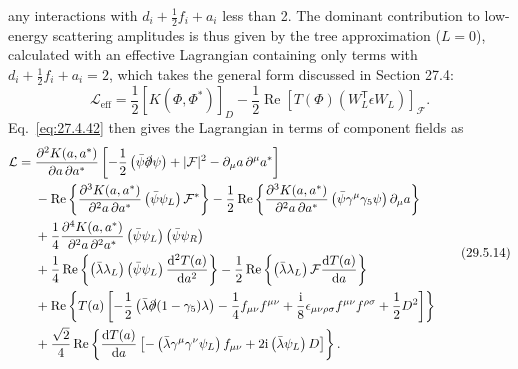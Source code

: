 any interactions with \(d_i+\tfrac12f_i+a_i\) less than 2. The dominant
contribution to low-energy scattering amplitudes is thus given by the tree
approximation (\(L=0\)), calculated with an effective Lagrangian containing
only terms with \(d_i+\tfrac12f_i+a_i=2\), which takes the general form
discussed in Section 27.4:
\begin{equation}
  \mathcal{L}_{\mathrm{eff}}
  =\frac12\left[K(\Phi,\Phi^*)\right]_D
  -\frac12\operatorname{Re}
    \left[T(\Phi)\left(W_L^{\mathsf T}\epsilon W_L\right)\right]_{\mathcal F}.
  \tag{29.5.13}\label{eq:29.5.13}
\end{equation}
Eq.~\eqref{eq:27.4.42} then gives the Lagrangian in terms of component
fields as
\begin{equation}
  \begin{aligned}
  \mathcal{L}
  ={}&
  \frac{\partial^2K(a,a^*)}{\partial a\,\partial a^*}
  \left[
    -\frac12\left(\bar\psi\slashed{\partial}\psi\right)
    +\lvert\mathcal{F}\rvert^2
    -\partial_\mu a\,\partial^\mu a^*
  \right]
  \\
  &-\operatorname{Re}\left\{
    \frac{\partial^3K(a,a^*)}{\partial^2a\,\partial a^*}
    \left(\bar\psi\psi_L\right)\mathcal{F}^*
  \right\}
  -\frac12\operatorname{Re}\left\{
    \frac{\partial^3K(a,a^*)}{\partial^2a\,\partial a^*}
    \left(\bar\psi\gamma^\mu\gamma_5\psi\right)\partial_\mu a
  \right\}
  \\
  &+\frac14
    \frac{\partial^4K(a,a^*)}{\partial^2a\,\partial^2a^*}
    \left(\bar\psi\psi_L\right)\left(\bar\psi\psi_R\right)
  \\
  &+\frac14\operatorname{Re}\left\{
    \left(\bar\lambda\lambda_L\right)
    \left(\bar\psi\psi_L\right)\frac{\mathop{}\!\mathrm{d}^2T(a)}{\mathop{}\!\mathrm{d} a^2}
  \right\}
  -\frac12\operatorname{Re}\left\{
    \left(\bar\lambda\lambda_L\right)\mathcal{F}\frac{\mathop{}\!\mathrm{d} T(a)}{\mathop{}\!\mathrm{d} a}
  \right\}
  \\
  &+\operatorname{Re}\left\{
    T(a)\left[
      -\frac12\left(\bar\lambda\slashed{\partial}(1-\gamma_5)\lambda\right)
      -\frac14f_{\mu\nu}f^{\mu\nu}
      +\frac{\mathrm{i}}{8}\epsilon_{\mu\nu\rho\sigma}
        f^{\mu\nu}f^{\rho\sigma}
      +\frac12D^2
    \right]
  \right\}
  \\
  &+\frac{\sqrt{2}}{4}\operatorname{Re}\left\{
    \frac{\mathop{}\!\mathrm{d} T(a)}{\mathop{}\!\mathrm{d} a}\left[
      -\left(\bar\lambda\gamma^\mu\gamma^\nu\psi_L\right)f_{\mu\nu}
      +2\mathrm{i}\left(\bar\lambda\psi_L\right)D
    \right]
  \right\}.
  \end{aligned}
  \tag{29.5.14}\label{eq:29.5.14}
\end{equation}
